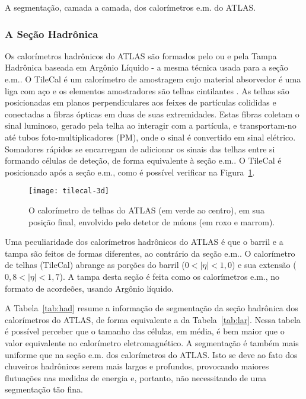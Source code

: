 \begin{table}
\caption{A segmentação, camada a camada, dos calo\-rí\-metros e.m. do ATLAS.}
\label{tab:lar}
\begin{center}

\end{center}
\end{table}

\subsubsection{A Seção Hadrônica}

Os calorímetros hadrônicos do ATLAS são formados pelo  ou  e pela Tampa Hadrônica baseada em Argônio Líquido
- a mesma técnica usada para a seção e.m.. O TileCal é um calorímetro de
amostragem cujo material absorvedor é uma liga com aço e os elementos
amostradores são telhas cintilantes \cite{tilecal}. As telhas são posicionadas
em planos perpendiculares aos feixes de partículas colididas e conectadas a
fibras ópticas em duas de suas extremidades. Estas fibras coletam o sinal
luminoso, gerado pela telha ao interagir com a partícula, e transportam-no até
tubos foto-multiplicadores (PM), onde o sinal
é convertido em sinal elétrico. Somadores rápidos \cite{seixas:adder} se
encarregam de adicionar os sinais das telhas entre si formando células de
deteção, de forma equivalente à seção e.m.. O TileCal é posicionado após a
seção e.m., como é possível verificar na Figura~\ref{fig:tile-pos}.

\begin{figure}
\begin{center}
\texttt{[image: tilecal-3d]}
\end{center}
\caption{O calorímetro de telhas do ATLAS (em verde ao centro), em sua posição
final, envolvido pelo detetor de múons (em roxo e marrom).}
\label{fig:tile-pos}
\end{figure}

Uma peculiaridade dos calorímetros hadrônicos do ATLAS é que o barril e a
tampa são feitos de formas diferentes, ao contrário da seção e.m.. O
calorímetro de telhas (TileCal) abrange as porções do barril ($0<|\eta|<1,0$)
e sua extensão ($0,8<|\eta|<1,7$). A tampa desta seção é feita como os
calorímetros e.m., no formato de acordeões, usando Argônio líquido.

A Tabela~\ref{tab:had} resume a informação de segmentação da seção hadrônica
dos calorímetros do ATLAS, de forma equivalente a da Tabela~\ref{tab:lar}.
Nessa tabela é possível perceber que o tamanho das células, em média, é bem
maior que o valor equivalente no calorímetro eletromagnético. A segmentação
é também mais uniforme que na seção e.m. dos calorímetros do ATLAS. Isto se
deve ao fato dos chuveiros hadrônicos serem mais largos e profundos,
provocando maiores flutuações nas medidas de energia e, portanto, não
necessitando de uma segmentação tão fina.

